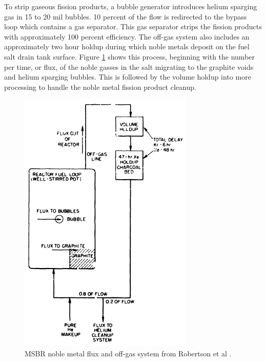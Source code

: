 To strip gaseous fission products, a bubble generator introduces helium sparging gas in 15 to 20 mil bubbles. 10 percent of the flow is redirected to the bypass loop which contains a gas separator. This gas separator strips the fission products with approximately 100 percent efficiency. The off-gas system also includes an approximately two hour holdup during which noble metals deposit on the fuel salt drain tank surface. Figure \ref{fig:msbr_nm_pa} shows this process, beginning with the number per time, or flux, of the noble gasses in the salt migrating to the graphite voids and helium sparging bubbles. This is followed by the volume holdup into more processing to handle the noble metal fission product cleanup.

\begin{figure}[H]
  \centering
  \includegraphics[scale=0.65]{images/msbr_nm_robertson.PNG}
  \caption{MSBR noble metal flux and off-gas system from Robertson et al \cite{robertson_conceptual_1971}.}
   \label{fig:msbr_nm_pa}
\end{figure}




